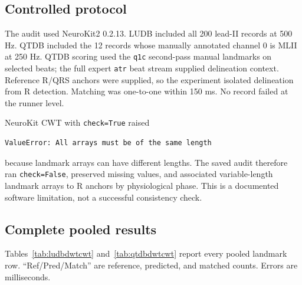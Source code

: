 \documentclass[11pt,a4paper]{article}
\begin{document}
\subsection{Controlled protocol}

The audit used NeuroKit2 0.2.13. LUDB included all 200 lead-II records at 500 Hz. QTDB included the 12 records whose manually annotated channel 0 is MLII at 250 Hz. QTDB scoring used the \texttt{q1c} second-pass manual landmarks on selected beats; the full expert \texttt{atr} beat stream supplied delineation context. Reference R/QRS anchors were supplied, so the experiment isolated delineation from R detection. Matching was one-to-one within 150 ms. No record failed at the runner level.

NeuroKit CWT with \texttt{check=True} raised
\begin{lstlisting}
ValueError: All arrays must be of the same length
\end{lstlisting}
because landmark arrays can have different lengths. The saved audit therefore ran \texttt{check=False}, preserved missing values, and associated variable-length landmark arrays to R anchors by physiological phase. This is a documented software limitation, not a successful consistency check.

\subsection{Complete pooled results}

Tables~\ref{tab:ludbdwtcwt} and~\ref{tab:qtdbdwtcwt} report every pooled landmark row. ``Ref/Pred/Match'' are reference, predicted, and matched counts. Errors are milliseconds.
\end{document}
